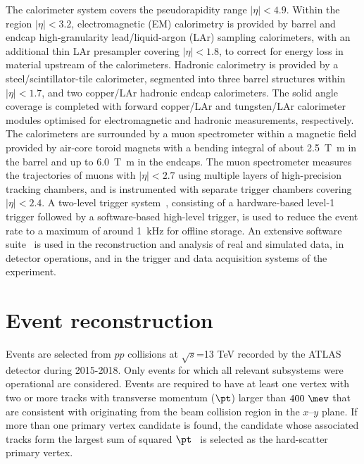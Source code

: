 \documentclass[PAPER, coverpage, atlasdraft=true, texlive=2016, UKenglish]{\ATLASLATEXPATH atlasdoc}
\begin{document}
The calorimeter system covers the pseudorapidity range $|\eta| < 4.9$. Within the region $|\eta|< 3.2$, electromagnetic (EM) calorimetry is provided by barrel and endcap high-granularity lead/liquid-argon (LAr) sampling calorimeters, with an additional thin LAr presampler covering $|\eta| < 1.8$, to correct for energy loss in material upstream of the calorimeters. Hadronic calorimetry is provided by %
a steel/scintillator-tile calorimeter, segmented into three barrel structures within $|\eta| < 1.7$, and two copper/LAr hadronic endcap calorimeters.
The solid angle coverage is completed with forward copper/LAr and tungsten/LAr calorimeter modules optimised for electromagnetic and hadronic measurements, respectively.
The calorimeters are surrounded by a muon spectrometer within a magnetic field provided by air-core toroid magnets with a bending integral of about \SI{2.5}{\tesla\metre} in the barrel and up to \SI{6.0}{\tesla\metre} in the endcaps. 
The muon spectrometer measures the trajectories of muons with $|\eta|<2.7$ using multiple layers of high-precision tracking chambers, and is instrumented with separate trigger chambers covering $|\eta|<2.4$. A two-level trigger system~\cite{Aaboud:2016leb}, consisting of a hardware-based level-1 trigger followed by a software-based high-level trigger, is used to reduce the event rate to a maximum of around \SI{1}{\kHz} for offline storage.
An extensive software suite~\cite{ATL-SOFT-PUB-2021-001} is used in the reconstruction and analysis of real and simulated data, in detector operations, and in the trigger and data acquisition systems of the experiment.


\section{Event reconstruction}
\label{sec:objects}

Events are selected from $pp$ collisions at $\sqrt{s}$=13 TeV recorded by the ATLAS detector during 2015-2018.
Only events for which all relevant subsystems were operational are considered.
Events are required to have at least one vertex with two or more tracks with transverse momentum
($\pt$) larger than $400~\mev$ that are consistent with originating from the 
beam collision region in the $x$--$y$ plane. If more than one primary vertex candidate is found, the
candidate whose associated tracks form the largest sum of squared $\pt$~\cite{ATL-PHYS-PUB-2015-026}
is selected as the hard-scatter primary vertex.
\end{document}
